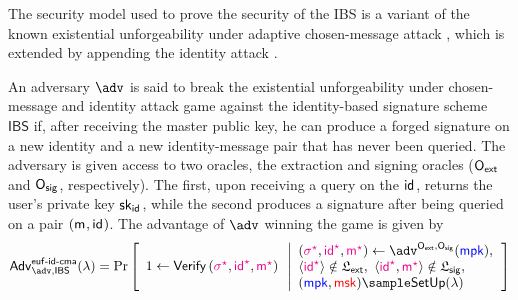 \documentclass[version=submission, floatrow]{iacrcc}
\begin{document}
The security model used to prove the security of the IBS is a variant of the known existential unforgeability under adaptive chosen-message attack \cite{Goldwasser1984}, which is extended by appending the identity attack \cite{Gentry2002}.\begin{definition}\label{def: euf-id-cma}
    An adversary $\adv$ is said to break the existential unforgeability under chosen-message and identity attack game against the identity-based signature scheme $\mathsf{IBS}$ if, after receiving the master public key, he can produce a forged signature on a new identity and a new identity-message pair that has never been queried. The adversary is given access to two oracles, the extraction and signing oracles ($\mathsf{O}_{\mathsf{ext}}$ and $\mathsf{O}_{\mathsf{sig}}$, respectively). The first, upon receiving a query on the $\mathsf{id}_{}$, returns the user's private key $\mathsf{sk}_{\mathsf{id}_{}}$, while the second produces a signature after being queried on a pair $(\mathsf{m}_{}, \mathsf{id}_{})$. The advantage of $\adv$ winning the game is given by
    \begin{equation}
    \mathsf{Adv}_{\adv, \mathsf{IBS}}^{\mathsf{euf}\text{-}\mathsf{id}\text{-}\mathsf{cma}}(\lambda) =
    \Probability{\begin{array}{ll}
        \\
        1 \leftarrow \Verify{\Forge{\sigma}, \Forge{\id{}}, \Forge{\msg{}}} \\
        \\ 
    \end{array} \left|
    \begin{array}{ll}
        \left(\Forge{\sigma}, \Forge{\id{}}, \Forge{\msg{}}\right) \leftarrow \adv^{\ExtractionOracle,\SignatureOracle}(\mpk), \\
        \Braket{\Forge{\id{}}} \notin\mathfrak{L}_{\mathsf{ext}},\ \Braket{\Forge{\id{}}, \Forge{\msg{}}} \notin \mathfrak{L}_{\mathsf{sig}},\\ 
        (\mpk, \msk) \sample \mathsf{SetUp}(\lambda)  \\
    \end{array}\right.
    }
    \end{equation}
\end{definition}
\end{document}
